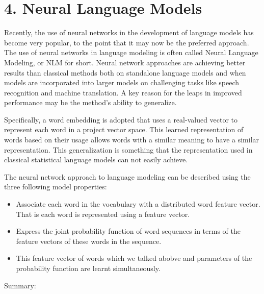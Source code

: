 \documentclass[11pt]{article}
\providecommand{\tightlist}{%
      \setlength{\itemsep}{0pt}\setlength{\parskip}{0pt}}
\begin{document}
    \hypertarget{neural-language-models}{%
\section{4. Neural Language Models}\label{neural-language-models}}

    Recently, the use of neural networks in the development of language
models has become very popular, to the point that it may now be the
preferred approach. The use of neural networks in language modeling is
often called Neural Language Modeling, or NLM for short. Neural network
approaches are achieving better results than classical methods both on
standalone language models and when models are incorporated into larger
models on challenging tasks like speech recognition and machine
translation. A key reason for the leaps in improved performance may be
the method's ability to generalize.

Specifically, a word embedding is adopted that uses a real-valued vector
to represent each word in a project vector space. This learned
representation of words based on their usage allows words with a similar
meaning to have a similar representation. This generalization is
something that the representation used in classical statistical language
models can not easily achieve.

The neural network approach to language modeling can be described using
the three following model properties:

\begin{itemize}
\tightlist
\item
  Associate each word in the vocabulary with a distributed word feature
  vector. That is each word is represented using a feature vector.
\item
  Express the joint probability function of word sequences in terms of
  the feature vectors of these words in the sequence.
\item
  This feature vector of words which we talked abobve and parameters of
  the probability function are learnt simultaneously.
\end{itemize}

Summary:
\end{document}
